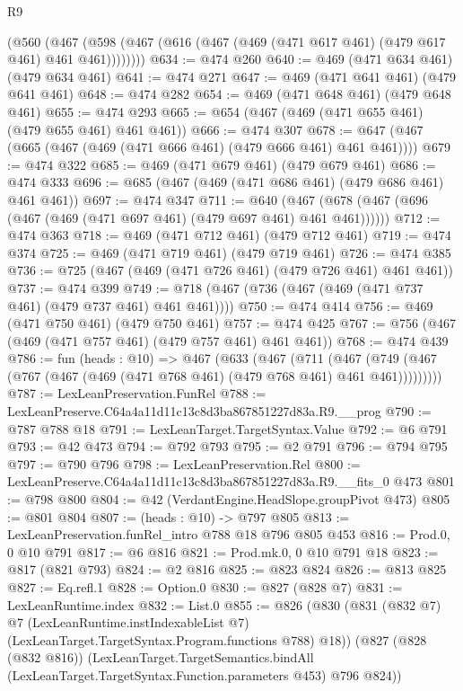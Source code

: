 \begin{lexlean}{R9}
\begin{coremodule}
      (@560 (@467 (@598 (@467 (@616 (@467 (@469 (@471 @617 @461) (@479 @617 @461) @461 @461))))))))
@634 := @474 @260
@640 := @469 (@471 @634 @461) (@479 @634 @461)
@641 := @474 @271
@647 := @469 (@471 @641 @461) (@479 @641 @461)
@648 := @474 @282
@654 := @469 (@471 @648 @461) (@479 @648 @461)
@655 := @474 @293
@665 := @654 (@467 (@469 (@471 @655 @461) (@479 @655 @461) @461 @461))
@666 := @474 @307
@678 := @647 (@467 (@665 (@467 (@469 (@471 @666 @461) (@479 @666 @461) @461 @461))))
@679 := @474 @322
@685 := @469 (@471 @679 @461) (@479 @679 @461)
@686 := @474 @333
@696 := @685 (@467 (@469 (@471 @686 @461) (@479 @686 @461) @461 @461))
@697 := @474 @347
@711 := @640 (@467 (@678 (@467 (@696 (@467 (@469 (@471 @697 @461) (@479 @697 @461) @461 @461))))))
@712 := @474 @363
@718 := @469 (@471 @712 @461) (@479 @712 @461)
@719 := @474 @374
@725 := @469 (@471 @719 @461) (@479 @719 @461)
@726 := @474 @385
@736 := @725 (@467 (@469 (@471 @726 @461) (@479 @726 @461) @461 @461))
@737 := @474 @399
@749 := @718 (@467 (@736 (@467 (@469 (@471 @737 @461) (@479 @737 @461) @461 @461))))
@750 := @474 @414
@756 := @469 (@471 @750 @461) (@479 @750 @461)
@757 := @474 @425
@767 := @756 (@467 (@469 (@471 @757 @461) (@479 @757 @461) @461 @461))
@768 := @474 @439
@786 := fun (heads : @10) =>
  @467
    (@633
      (@467
        (@711
          (@467 (@749 (@467 (@767 (@467 (@469 (@471 @768 @461) (@479 @768 @461) @461 @461)))))))))
@787 := LexLeanPreservation.FunRel
@788 := LexLeanPreserve.C64a4a11d11c13c8d3ba867851227d83a.R9.__prog
@790 := @787 @788 @18
@791 := LexLeanTarget.TargetSyntax.Value
@792 := @6 @791
@793 := @42 @473
@794 := @792 @793
@795 := @2 @791
@796 := @794 @795
@797 := @790 @796
@798 := LexLeanPreservation.Rel
@800 := LexLeanPreserve.C64a4a11d11c13c8d3ba867851227d83a.R9.__fits_0 @473
@801 := @798 @800
@804 := @42 (VerdantEngine.HeadSlope.groupPivot @473)
@805 := @801 @804
@807 := (heads : @10) -> @797 @805
@813 := LexLeanPreservation.funRel_intro @788 @18 @796 @805 @453
@816 := Prod.{0, 0} @10 @791
@817 := @6 @816
@821 := Prod.mk.{0, 0} @10 @791 @18
@823 := @817 (@821 @793)
@824 := @2 @816
@825 := @823 @824
@826 := @813 @825
@827 := Eq.refl.{1}
@828 := Option.{0}
@830 := @827 (@828 @7)
@831 := LexLeanRuntime.index
@832 := List.{0}
@855 := @826
    (@830
      (@831
        (@832 @7)
        @7
        (LexLeanRuntime.instIndexableList @7)
        (LexLeanTarget.TargetSyntax.Program.functions @788)
        @18))
    (@827
      (@828 (@832 @816))
      (LexLeanTarget.TargetSemantics.bindAll
        (LexLeanTarget.TargetSyntax.Function.parameters @453)
        @796
        @824))

\end{coremodule}
\end{lexlean}
